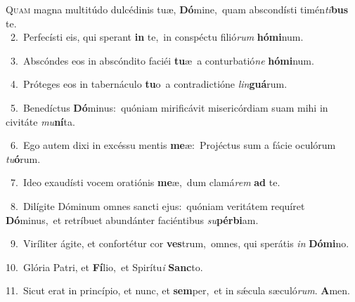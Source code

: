 \lettrine{\initial\textcolor{\initialcolor}{Q}}{uam} magna multitúdo dulcédinis tuæ, \textbf{Dó}\-mine,~\star quam abscondísti timén\-\textit{ti}\-\textbf{bus} te.\\
{\numbfont\textcolor{\numbcolor}{~2.}}~Perfecísti eis, qui sperant \textbf{in} te,~\star in conspéctu filió\textit{rum} \textbf{hó}\-\textbf{mi}num.\par
{\numbfont\textcolor{\numbcolor}{~3.}}~Abscóndes eos in abscóndito faciéi \textbf{tu}\-æ~\star a conturbatió\textit{ne} \textbf{hó}\-\textbf{mi}num.\par
{\numbfont\textcolor{\numbcolor}{~4.}}~Próteges eos in tabernáculo \textbf{tu}\-o~\star a contradictióne \textit{lin}\-\textbf{guá}rum.\par
{\numbfont\textcolor{\numbcolor}{~5.}}~Benedíctus \textbf{Dó}\-minus:~\star quóniam mirificávit misericórdiam suam mihi in civitáte \textit{mu}\-\textbf{ní}ta.\par
{\numbfont\textcolor{\numbcolor}{~6.}}~Ego autem dixi in excéssu mentis \textbf{me}\-æ:~\star Projéctus sum a fácie oculórum \textit{tu}\-\textbf{ó}rum.\par
{\numbfont\textcolor{\numbcolor}{~7.}}~Ideo exaudísti vocem oratiónis \textbf{me}\-æ,~\star dum clamá\textit{rem} \textbf{ad} te.\par
{\numbfont\textcolor{\numbcolor}{~8.}}~Dilígite Dóminum omnes sancti ejus:~\dagger quóniam veritátem requíret \textbf{Dó}\-minus,~\star et retríbuet abundánter faciéntibus \textit{su}\-\textbf{pér}\textbf{bi}am.\par
{\numbfont\textcolor{\numbcolor}{~9.}}~Viríliter ágite, et confortétur cor \textbf{ves}\-trum,~\star omnes, qui sperátis \textit{in} \textbf{Dó}\-\textbf{mi}no.\par
{\numbfont\textcolor{\numbcolor}{10.}}~Glória Patri, et \textbf{Fí}\-lio,~\star et Spirítu\textit{i} \textbf{Sanc}\-to.\par
{\numbfont\textcolor{\numbcolor}{11.}}~Sicut erat in princípio, et nunc, et \textbf{sem}\-per,~\star et in sǽcula sæculó\-\textit{rum}\-. \textbf{A}\-men.\par
